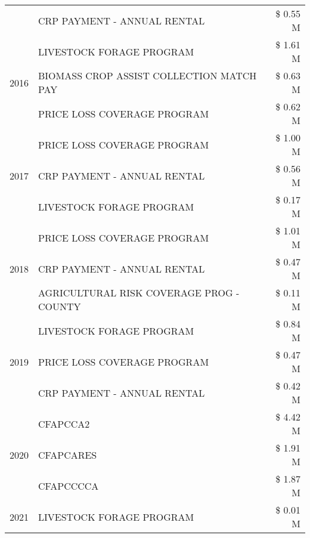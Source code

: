 \begin{tabular}{llr}
 & CRP PAYMENT - ANNUAL RENTAL & \$ 0.55 M \\
\cline{1-3}
\multirow[t]{3}{*}{2016} & LIVESTOCK FORAGE PROGRAM                      & \$ 1.61 M \\
 & BIOMASS CROP ASSIST COLLECTION MATCH PAY      & \$ 0.63 M \\
 & PRICE LOSS COVERAGE PROGRAM                   & \$ 0.62 M \\
\cline{1-3}
\multirow[t]{3}{*}{2017} & PRICE LOSS COVERAGE PROGRAM & \$ 1.00 M \\
 & CRP PAYMENT - ANNUAL RENTAL & \$ 0.56 M \\
 & LIVESTOCK FORAGE PROGRAM & \$ 0.17 M \\
\cline{1-3}
\multirow[t]{3}{*}{2018} & PRICE LOSS COVERAGE PROGRAM & \$ 1.01 M \\
 & CRP PAYMENT - ANNUAL RENTAL & \$ 0.47 M \\
 & AGRICULTURAL RISK COVERAGE PROG - COUNTY & \$ 0.11 M \\
\cline{1-3}
\multirow[t]{3}{*}{2019} & LIVESTOCK FORAGE PROGRAM & \$ 0.84 M \\
 & PRICE LOSS COVERAGE PROGRAM & \$ 0.47 M \\
 & CRP PAYMENT - ANNUAL RENTAL & \$ 0.42 M \\
\cline{1-3}
\multirow[t]{3}{*}{2020} & CFAPCCA2 & \$ 4.42 M \\
 & CFAPCARES & \$ 1.91 M \\
 & CFAPCCCCA & \$ 1.87 M \\
\cline{1-3}
2021 & LIVESTOCK FORAGE PROGRAM & \$ 0.01 M \\
\cline{1-3}
\bottomrule
\end{tabular}
